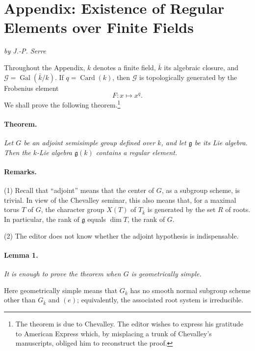 
\section{Appendix: Existence of Regular Elements over Finite Fields}

\begin{center}
\itshape by J.-P. Serre
\end{center}

Throughout the Appendix, \(k\) denotes a finite field,
\(\bar k\) its algebraic closure, and
\(\mathcal G=\operatorname{Gal}(\bar k/k)\). If
\(q=\operatorname{Card}(k)\), then \(\mathcal G\) is
topologically generated by the Frobenius element
\[
  F\colon x\longmapsto x^q.
\]
We shall prove the following theorem.\footnote{The theorem is due
to Chevalley. The editor wishes to express his gratitude to
American Express which, by misplacing a trunk of Chevalley's
manuscripts, obliged him to reconstruct the proof.}

\paragraph{\textbf{Theorem.}}
{\itshape Let \(G\) be an adjoint semisimple group defined over
\(k\), and let \(\mathfrak g\) be its Lie algebra. Then the
\(k\)-Lie algebra \(\mathfrak g(k)\) contains a regular element.}

\paragraph{\textbf{Remarks.}}
\textup{(1)} Recall that ``adjoint'' means that the center of
\(G\), as a subgroup scheme, is trivial. In view of the Chevalley
seminar, this also means that, for a maximal torus \(T\) of
\(G\), the character group \(X(T)\) of \(T_{\bar k}\) is
generated by the set \(R\) of roots. In particular, the rank of
\(\mathfrak g\) equals \(\dim T\), the rank of \(G\).

\textup{(2)} The editor does not know whether the adjoint
hypothesis is indispensable.

\paragraph{\textbf{Lemma 1.}}
{\itshape It is enough to prove the theorem when \(G\) is
geometrically simple.}

Here geometrically simple means that \(G_{\bar k}\) has no smooth
normal subgroup scheme other than \(G_{\bar k}\) and \((e)\);
equivalently, the associated root system is irreducible.

